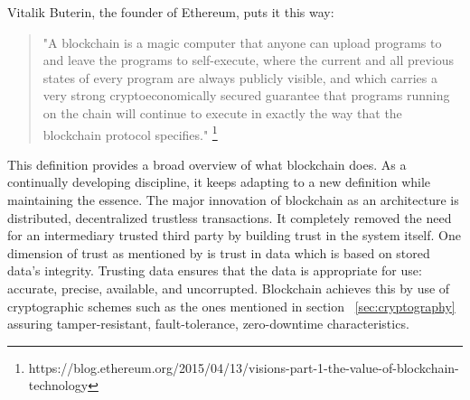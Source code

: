 Vitalik Buterin, the founder of Ethereum, puts it this way:  
\begin{quote}
	\centering
	"A blockchain is a magic computer that anyone can upload programs to and
	leave the programs to self-execute, where the current and all previous
	states of every program are always publicly visible, and which carries a
	very strong cryptoeconomically secured guarantee that programs running on
	the chain will continue to execute in exactly the way that the blockchain
	protocol specifies."
	\footnote{https://blog.ethereum.org/2015/04/13/visions-part-1-the-value-of-blockchain-technology} 
\end{quote}
This definition provides a broad overview of what blockchain does. As a
continually developing discipline, it keeps adapting to a new definition while
maintaining the essence. The major innovation of blockchain as an architecture
is distributed, decentralized trustless transactions\cite{Bitcoin_Satoshi}. It
completely removed the need for an intermediary trusted third party by building
trust in the system itself. One dimension of trust as mentioned by
\cite{miller2010trust} is trust in data which is based on stored data's
integrity. Trusting data ensures that the data is appropriate for use:
accurate, precise, available, and uncorrupted\cite{miller2010trust}.
Blockchain achieves this by use of cryptographic schemes such as the ones
mentioned in section ~\ref{sec:cryptography} assuring tamper-resistant,
fault-tolerance, zero-downtime characteristics\cite{swan2015blockchain}. 
\newpage

 
